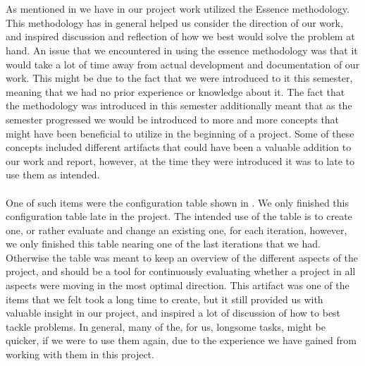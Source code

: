 \\\\
As mentioned in  we have in our project work utilized the Essence methodology. This methodology has in general helped us consider the direction of our work, and inspired discussion and reflection of how we best would solve the problem at hand. An issue that we encountered in using the essence methodology was that it would take a lot of time away from actual development and documentation of our work. This might be due to the fact that we were introduced to it this semester, meaning that we had no prior experience or knowledge about it. The fact that the methodology was introduced in this semester additionally meant that as the semester progressed we would be introduced to more and more concepts that might have been beneficial to utilize in the beginning of a project. Some of these concepts included different artifacts that could have been a valuable addition to our work and report, however, at the time they were introduced it was to late to use them as intended.
\\\\
One of such items were the configuration table shown in . We only finished this configuration table late in the project. The intended use of the table is to create one, or rather evaluate and change an existing one, for each iteration, however, we only finished this table nearing one of the last iterations that we had. Otherwise the table was meant to keep an overview of the different aspects of the project, and should be a tool for continuously evaluating whether a project in all aspects were moving in the most optimal direction. This artifact was one of the items that we felt took a long time to create, but it still provided us with valuable insight in our project, and inspired a lot of discussion of how to best tackle problems. In general, many of the, for us, longsome tasks, might be quicker, if we were to use them again, due to the experience we have gained from working with them in this project. 

